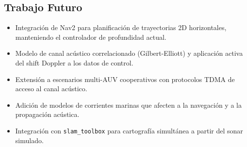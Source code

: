 \documentclass[10pt,twocolumn,letterpaper]{article}
\begin{document}
\subsection{Trabajo Futuro}

\begin{itemize}[leftmargin=*,itemsep=2pt]
    \item Integración de Nav2 para planificación de trayectorias 2D horizontales, manteniendo el controlador de profundidad actual.
    \item Modelo de canal acústico correlacionado (Gilbert-Elliott) y aplicación activa del shift Doppler a los datos de control.
    \item Extensión a escenarios multi-AUV cooperativos con protocolos TDMA de acceso al canal acústico.
    \item Adición de modelos de corrientes marinas que afecten a la navegación y a la propagación acústica.
    \item Integración con \texttt{slam\_toolbox} para cartografía simultánea a partir del sonar simulado.
\end{itemize}
\end{document}
